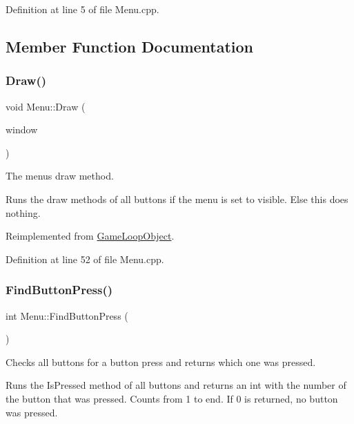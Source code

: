 Definition at line 5 of file Menu.\+cpp.



\subsection{Member Function Documentation}
\mbox{\label{class_menu_a9052b7f20dcf6d9ed47d87f16fcfe5e9}} 
\subsubsection{\texorpdfstring{Draw()}{Draw()}}
{\footnotesize\ttfamily void Menu\+::\+Draw (\begin{DoxyParamCaption}\item[{sf\+::\+Render\+Window \&}]{window }\end{DoxyParamCaption})\hspace{0.3cm}{\ttfamily [virtual]}}



The menu\textquotesingle{}s draw method. 

Runs the draw methods of all buttons if the menu is set to visible. Else this does nothing. 

Reimplemented from \hyperlink{class_game_loop_object_a0572a88e5b98fa8a41078260d152202d}{Game\+Loop\+Object}.



Definition at line 52 of file Menu.\+cpp.

\mbox{\label{class_menu_ac75194d487ea0f1eada384f887c78051}} 
\subsubsection{\texorpdfstring{Find\+Button\+Press()}{FindButtonPress()}}
{\footnotesize\ttfamily int Menu\+::\+Find\+Button\+Press (\begin{DoxyParamCaption}{ }\end{DoxyParamCaption})}



Checks all buttons for a button press and returns which one was pressed. 

Runs the Is\+Pressed method of all buttons and returns an int with the number of the button that was pressed. Counts from 1 to end. If 0 is returned, no button was pressed. 

